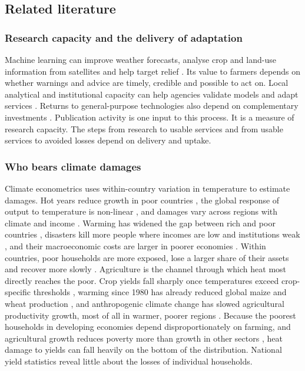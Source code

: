 \subsection{Related literature}\label{sec:lit}

\subsubsection{Research capacity and the delivery of adaptation}

Machine learning can improve weather forecasts, analyse crop and land-use information from
satellites and help target relief \citep{reichstein2025,rolnick2022,lealfilho2022}. Its value to
farmers depends on whether warnings and advice are timely, credible and possible to act on.
Local analytical and institutional capacity can help agencies validate models and adapt
services \citep{cowls2023,larosa2024}. Returns to general-purpose technologies also depend on
complementary investments \citep{brynjolfsson2021}. Publication activity is one input to this
process. It is a measure of research capacity. The steps from research to usable services and
from usable services to avoided losses depend on delivery and uptake.

\subsubsection{Who bears climate damages}

Climate econometrics uses within-country variation in temperature to estimate damages. Hot years
reduce growth in poor countries \citep{dell2012}, the global response of output to temperature is
non-linear \citep{burke2015}, and damages vary across regions with climate and income
\citep{kalkuhl2020,hsiang2016}. Warming has widened the gap between rich and poor countries
\citep{diffenbaugh2019}, disasters kill more people where incomes are low and institutions weak
\citep{kahn2005}, and their macroeconomic costs are larger in poorer economies \citep{noy2009}.
Within countries, poor households are more exposed, lose a larger share of their assets and recover
more slowly \citep{hallegatte2017}. Agriculture is the channel through which heat most directly
reaches the poor. Crop yields fall sharply once temperatures exceed crop-specific thresholds
\citep{schlenker2009}, warming since 1980 has already reduced global maize and wheat production
\citep{lobell2011}, and anthropogenic climate change has slowed agricultural productivity growth,
most of all in warmer, poorer regions \citep{ortizbobea2021}. Because the poorest households in
developing economies depend disproportionately on farming, and agricultural growth reduces poverty
more than growth in other sectors \citep{christiaensen2011}, heat damage to yields can fall heavily on the bottom of the distribution.
National yield statistics reveal little about the losses of individual households.

